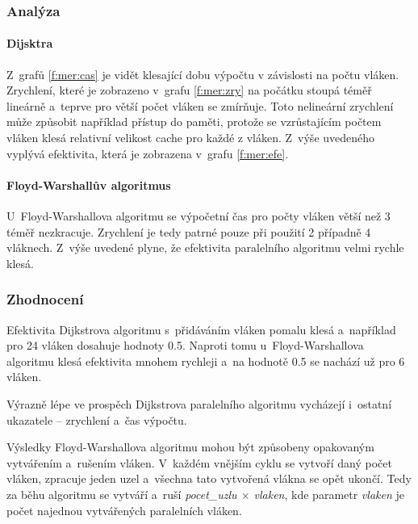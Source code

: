 \subsubsection{Analýza}
\paragraph{Dijsktra}
Z~grafů \ref{f:mer:cas} je vidět klesající dobu výpočtu v závislosti na počtu vláken.
Zrychlení, které je zobrazeno v~grafu \ref{f:mer:zry} na počátku stoupá téměř lineárně a~teprve pro větší počet vláken 
se zmírňuje. Toto nelineární zrychlení může způsobit například přístup do paměti, protože se vzrůstajícím počtem vláken klesá 
relativní velikost cache pro každé z vláken.
Z~výše uvedeného vyplývá efektivita, která je zobrazena v~grafu \ref{f:mer:efe}.

\paragraph{Floyd-Warshallův algoritmus}
U~Floyd-Warshallova algoritmu se výpočetní čas pro počty vláken větší než 3 téměř nezkracuje. 
Zrychlení je tedy patrné pouze při použití 2 případně 4 vláknech. Z~výše uvedené plyne, že efektivita paralelního algoritmu velmi rychle klesá.

\subsubsection{Zhodnocení}
Efektivita Dijkstrova algoritmu s~přidáváním vláken pomalu klesá a~například pro 24 vláken dosahuje hodnoty 0.5. Naproti tomu u~Floyd-Warshallova algoritmu klesá efektivita mnohem rychleji a~na hodnotě 0.5 se nachází už pro 6 vláken. 

Výrazně lépe ve prospěch Dijkstrova paralelního algoritmu vycházejí i~ostatní ukazatele -- zrychlení a~čas výpočtu.

Výsledky Floyd-Warshallova algoritmu mohou být způsobeny opakovaným vytvářením a~rušením vláken. V~každém vnějším cyklu se vytvoří daný počet vláken, zpracuje jeden uzel a~všechna tato vytvořená vlákna se opět ukončí. Tedy za běhu algoritmu se vytváří a~ruší \textit{pocet\_uzlu $\times$ vlaken}, kde parametr \textit{vlaken} je počet najednou vytvářených paralelních vláken.



